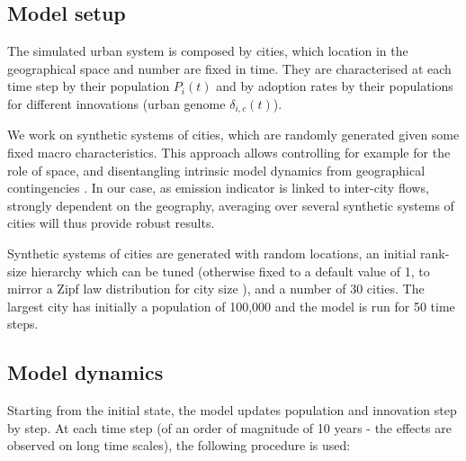 \documentclass[final,5p,times,twocolumn,authoryear]{elsarticle}
\begin{document}
\subsection{Model setup}

The simulated urban system is composed by cities, which location in the geographical space and number are fixed in time. They are characterised at each time step by their population $P_i (t)$ and by adoption rates by their populations for different innovations (urban genome $\delta_{i,c} (t)$).

We work on synthetic systems of cities, which are randomly generated given some fixed macro characteristics. This approach allows controlling for example for the role of space, and disentangling intrinsic model dynamics from geographical contingencies \citep{raimbault2019space}. In our case, as emission indicator is linked to inter-city flows, strongly dependent on the geography, averaging over several synthetic systems of cities will thus provide robust results.

Synthetic systems of cities are generated with random locations, an initial rank-size hierarchy which can be tuned (otherwise fixed to a default value of 1, to mirror a Zipf law distribution for city size \citep{cottineau2017metazipf}), and a number of 30 cities. The largest city has initially a population of 100,000 and the model is run for 50 time steps. 


\subsection{Model dynamics}

Starting from the initial state, the model updates population and innovation step by step. At each time step (of an order of magnitude of 10 years - the effects are observed on long time scales), the following procedure is used:
\end{document}
